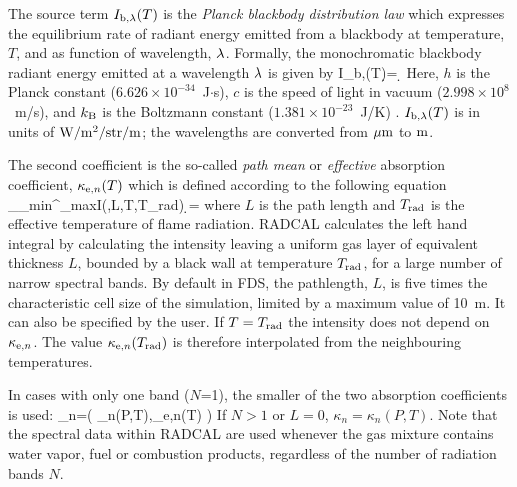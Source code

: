 The source term $I_{\rm b,\lambda}(T)$ is the {\em Planck blackbody distribution law} which expresses the equilibrium rate of radiant energy emitted from a blackbody at temperature, $T$, and as function of wavelength, $\lambda$. Formally, the monochromatic blackbody radiant energy emitted at a wavelength $\lambda$ is given by \cite{Penner:1959}
\be \label{eq:Planck_law}
I_{\rm b,\la}(T)\d \la = \d \la
\ee
Here, $h$ is the Planck constant ($6.626 \times 10^{-34}$~J$\cdot$s), $c$ is the speed of light in vacuum ($2.998 \times 10^8$~m/s), and $k_{\rm B}$ is the Boltzmann constant ($1.381 \times 10^{-23}$~J/K) \cite{Mohr:2012}.
$I_{\rm b,\lambda}(T)$ is in units of $\rm{W/m^{2}/str/m}$; the wavelengths are converted from $\rm{\mu m}$ to $\rm{m}$.

The second coefficient is the so-called {\em path mean} or {\em effective} absorption coefficient, $\kappa_{{\rm e},n}(T)$ which is defined according to the following equation
\be
   \int_{\la_{\rm min}}^{\la_{\rm max}}I(\la,L,T,T_{\rm rad}) \; \d \la = \frac{\sigma}{\pi}
\ee
where $L$ is the path length and $T_{\rm rad}$ is the effective temperature of flame radiation. RADCAL calculates the left hand integral by calculating the intensity leaving a uniform gas layer of equivalent thickness $L$, bounded by a black wall at temperature $T_{\rm rad}$, for a large number of narrow spectral bands.  By default in FDS, the pathlength, $L$, is five times the characteristic cell size of the simulation, limited by a maximum value of 10~m. It can also be specified by the user. If $T=T_{\rm rad}$ the intensity does not depend on $\kappa_{{\rm e},n}$. The value $\kappa_{{\rm e},n}(T_{\rm rad})$ is therefore interpolated from the neighbouring temperatures.

In cases with only one band ($N$=1), the smaller of the two absorption coefficients is used:
\be
   \kappa_n=\min \Big( \kappa_n(P,T),\kappa_{{\rm e},n}(T) \Big)
\ee
If $N>1$ or $L=0$, $\kappa_n=\kappa_n(P,T)$. Note that the spectral data within RADCAL are used whenever the gas mixture contains water vapor, fuel or combustion products, regardless of the number of radiation bands $N$.

